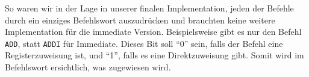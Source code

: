 \documentclass[paper=a4,fontsize=12pt,twocolumn]{scrreprt}
\begin{document}




So waren wir in der Lage in unserer finalen Implementation, jeden der Befehle durch ein einziges Befehlswort auszudrücken und brauchten keine weitere Implementation für die immediate Version.
Beispielsweise gibt es nur den Befehl \texttt{ADD}, statt \texttt{ADDI} für Immediate.
Dieses Bit soll \enquote{0} sein, falls der Befehl eine Registerzuweisung ist, und \enquote{1}, falls es eine Direktzuweisung gibt.
Somit wird im Befehlswort ersichtlich, was zugewiesen wird.
\end{document}
